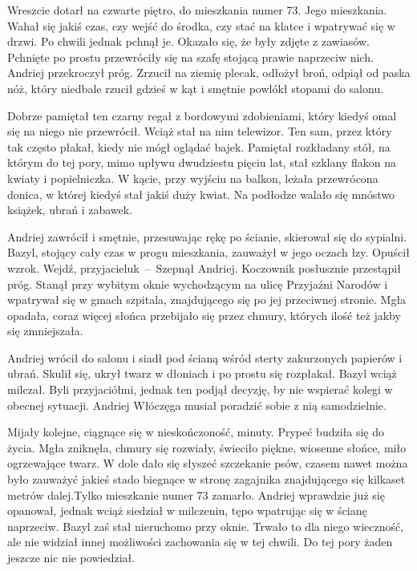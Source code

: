 \documentclass[../MAIN.tex]{subfiles}
\begin{document}
Wreszcie dotarł na czwarte piętro, do mieszkania numer 73. Jego mieszkania. Wahał się jakiś czas, czy wejść do środka, czy stać na klatce i wpatrywać się w drzwi. Po chwili jednak pchnął je. Okazało się, że były zdjęte z zawiasów. Pchnięte po prostu przewróciły się na szafę stojącą prawie naprzeciw nich. Andriej przekroczył próg. Zrzucił na ziemię plecak, odłożył broń, odpiął od paska nóż, który niedbale rzucił gdzieś w kąt i smętnie powlókł stopami do salonu.

Dobrze pamiętał ten czarny regał z bordowymi zdobieniami, który kiedyś omal się na niego nie przewrócił. Wciąż stał na nim telewizor. Ten sam, przez który tak często płakał, kiedy nie mógł oglądać bajek. Pamiętał rozkładany stół, na którym do tej pory, mimo upływu dwudziestu pięciu lat, stał szklany flakon na kwiaty i popielniczka. W kącie, przy wyjściu na balkon, leżała przewrócona donica, w której kiedyś stał jakiś duży kwiat. Na podłodze walało się mnóstwo książek, ubrań i zabawek.%

Andriej zawrócił i smętnie, przesuwając rękę po ścianie, skierował się do sypialni. Bazyl, stojący cały czas w progu mieszkania, zauważył w jego oczach łzy. Opuścił wzrok.
\sx
Wejdź, przyjacielu\3k~--~Szepnął Andriej.
\qd
Koczownik posłusznie przestąpił próg. Stanął przy wybitym oknie wychodzącym na ulicę Przyjaźni Narodów i wpatrywał się w gmach szpitala, znajdującego się po jej przeciwnej stronie. Mgła opadała, coraz więcej słońca przebijało się przez chmury, których ilość też jakby się zmniejszała.

Andriej wrócił do salonu i siadł pod ścianą wśród sterty zakurzonych papierów i ubrań. Skulił się, ukrył twarz w dłoniach i po prostu się rozpłakał. Bazyl wciąż milczał. Byli przyjaciółmi, jednak ten podjął decyzję, by nie wspierać kolegi w obecnej sytuacji. Andriej Włóczęga musiał poradzić sobie z nią samodzielnie.%

Mijały kolejne, ciągnące się w nieskończoność, minuty. Prypeć budziła się do życia. Mgła zniknęła, chmury się rozwiały, świeciło piękne, wiosenne słońce, miło ogrzewające twarz. W dole dało się słyszeć szczekanie psów, czasem nawet można było zauważyć jakieś stado biegnące w stronę zagajnika znajdującego się kilkaset metrów dalej.Tylko mieszkanie numer 73 zamarło. Andriej wprawdzie już się opanował, jednak wciąż siedział w milczeniu, tępo wpatrując się w ścianę naprzeciw. Bazyl zaś stał nieruchomo przy oknie. Trwało to dla niego wieczność, ale nie widział innej możliwości zachowania się w tej chwili. Do tej pory żaden jeszcze nic nie powiedział.
\end{document}
